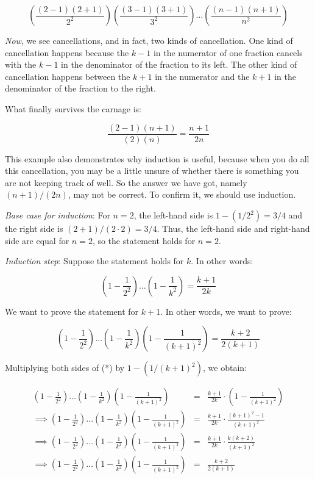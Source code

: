 \documentclass{amsart}
\begin{document}
$$\left(\frac{(2 - 1)(2 + 1)}{2^2}\right) \left(\frac{(3 - 1)(3 +
1)}{3^2} \right) \dots \left(\frac{(n - 1)(n + 1)}{n^2}\right)$$

{\em Now}, we see cancellations, and in fact, two kinds of
cancellation. One kind of cancellation happens because the $k - 1$ in
the numerator of one fraction cancels with the $k - 1$ in the
denominator of the fraction to its left. The other kind of
cancellation happens between the $k + 1$ in the numerator and the $k +
1$ in the denominator of the fraction to the right.

What finally survives the carnage is:

$$ \frac{(2 - 1)(n+1)}{(2)(n)} = \frac{n + 1}{2n}$$

This example also demonstrates why induction is useful, because when
you do all this cancellation, you may be a little unsure of whether
there is something you are not keeping track of well. So the answer we
have got, namely $(n + 1)/(2n)$, may not be correct. To confirm it, we
should use induction.

{\em Base case for induction}: For $n = 2$, the left-hand side is $1 -
(1/2^2) =3/4$ and the right side is $(2 + 1)/(2 \cdot 2) = 3/4$. Thus,
the left-hand side and right-hand side are equal for $n = 2$, so the
statement holds for $n = 2$.

{\em Induction step}: Suppose the statement holds for $k$. In other words:

\begin{equation*}
  \left(1 - \frac{1}{2^2} \right) \dots \left(1 - \frac{1}{k^2} \right) = \frac{k + 1}{2k} \tag{*}
\end{equation*}

We want to prove the statement for $k + 1$. In other words, we want to prove:

\begin{equation*}
  \left(1 - \frac{1}{2^2} \right) \dots \left(1 - \frac{1}{k^2} \right)\left(1 - \frac{1}{(k + 1)^2}\right) = \frac{k + 2}{2(k + 1)} \tag{**}
\end{equation*}

Multiplying both sides of (*) by $1 - (1/(k+1)^2)$, we obtain:

\begin{eqnarray*}
  \left(1 - \frac{1}{2^2} \right) \dots \left(1 - \frac{1}{k^2} \right)\left(1 - \frac{1}{(k+1)^2}\right) & = & \frac{k + 1}{2k} \cdot \left(1 - \frac{1}{(k+1)^2}\right)\\
  \implies \left(1 - \frac{1}{2^2} \right) \dots \left(1 - \frac{1}{k^2} \right)\left(1 - \frac{1}{(k+1)^2}\right) & = & \frac{k + 1}{2k} \cdot \frac{(k + 1)^2 - 1}{(k+1)^2}\\
  \implies \left(1 - \frac{1}{2^2} \right) \dots \left(1 - \frac{1}{k^2} \right)\left(1 - \frac{1}{(k+1)^2}\right) & = & \frac{k + 1}{2k} \cdot \frac{k(k + 2)}{(k+1)^2}\\
  \implies \left(1 - \frac{1}{2^2} \right) \dots \left(1 - \frac{1}{k^2} \right)\left(1 - \frac{1}{(k+1)^2}\right) & = & \frac{k + 2}{2(k + 1)}
\end{eqnarray*}
\end{document}
